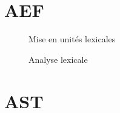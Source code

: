 \newpage
\appendix

\section{AEF}

\begin{figure}[H]
\centering

\caption{Mise en unités lexicales}
\end{figure}

\begin{figure}[H]
\centering

\caption{Analyse lexicale}
\end{figure}

\section{AST}
